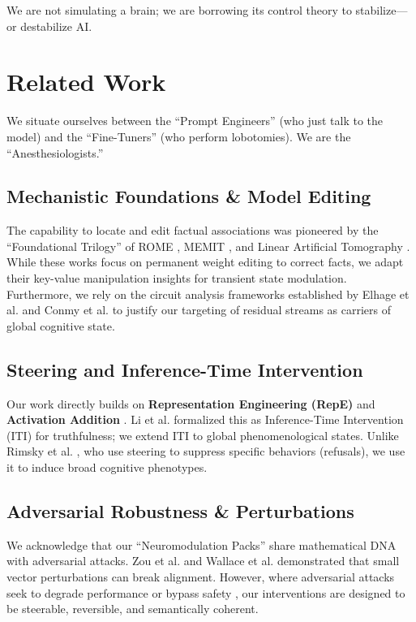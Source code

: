 \documentclass[10pt]{article}
\begin{document}
We are not simulating a brain; we are borrowing its control theory to stabilize—or destabilize AI.

\section{Related Work}

We situate ourselves between the ``Prompt Engineers'' (who just talk to the model) and the ``Fine-Tuners'' (who perform lobotomies). We are the ``Anesthesiologists.''

\subsection{Mechanistic Foundations \& Model Editing}
The capability to locate and edit factual associations was pioneered by the ``Foundational Trilogy'' of ROME \cite{meng2022}, MEMIT \cite{meng2023}, and Linear Artificial Tomography \cite{hernandez2023}. While these works focus on permanent weight editing to correct facts, we adapt their key-value manipulation insights for transient state modulation. Furthermore, we rely on the circuit analysis frameworks established by Elhage et al. \cite{elhage2021} and Conmy et al. \cite{conmy2023} to justify our targeting of residual streams as carriers of global cognitive state.

\subsection{Steering and Inference-Time Intervention}
Our work directly builds on \textbf{Representation Engineering (RepE)} \cite{zou2023_repe} and \textbf{Activation Addition} \cite{turner2023}. Li et al. \cite{li2023_iti} formalized this as Inference-Time Intervention (ITI) for truthfulness; we extend ITI to global phenomenological states. Unlike Rimsky et al. \cite{rimsky2023}, who use steering to suppress specific behaviors (refusals), we use it to induce broad cognitive phenotypes.

\subsection{Adversarial Robustness \& Perturbations}
We acknowledge that our ``Neuromodulation Packs'' share mathematical DNA with adversarial attacks. Zou et al. \cite{zou2023_attacks} and Wallace et al. \cite{wallace2019} demonstrated that small vector perturbations can break alignment. However, where adversarial attacks seek to degrade performance or bypass safety \cite{carlini2024}, our interventions are designed to be steerable, reversible, and semantically coherent.
\end{document}
